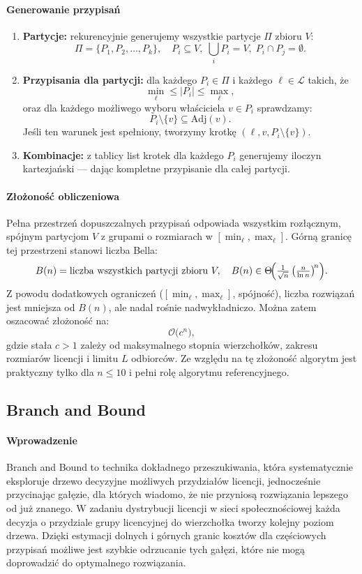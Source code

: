 \paragraph{Generowanie przypisań}
\begin{enumerate}
  \item \textbf{Partycje:} rekurencyjnie generujemy wszystkie partycje $\Pi$ zbioru $V$:
    \[
      \Pi = \{P_1,P_2,\dots,P_k\},\quad P_i\subseteq V,\;\bigcup_i P_i=V,\;P_i\cap P_j=\emptyset.
    \]
  \item \textbf{Przypisania dla partycji:} dla każdego $P_i\in\Pi$ i każdego $\ell\in\mathcal{L}$ takich, że 
    \[
      \min_\ell \le |P_i|\le \max_\ell,
    \]
    oraz dla każdego możliwego wyboru właściciela $v\in P_i$ sprawdzamy:
    \[
      P_i\setminus\{v\}\subseteq \mathrm{Adj}(v).
    \]
    Jeśli ten warunek jest spełniony, tworzymy krotkę $(\ell,v,P_i\setminus\{v\})$.
  \item \textbf{Kombinacje:} z tablicy list krotek dla każdego $P_i$ generujemy iloczyn kartezjański — dając kompletne przypisanie dla całej partycji.
\end{enumerate}

\paragraph{Złożoność obliczeniowa}
Pełna przestrzeń dopuszczalnych przypisań odpowiada wszystkim rozłącznym, spójnym partycjom $V$ z grupami o rozmiarach w $[\min_\ell,\max_\ell]$. Górną granicę tej przestrzeni stanowi liczba Bella:
\[
B(n)=\text{liczba wszystkich partycji zbioru }V,\quad
B(n)\in\Theta\!\Bigl(\tfrac{1}{\sqrt n}\,\bigl(\tfrac{n}{\ln n}\bigr)^{\!n}\Bigr).
\]
Z powodu dodatkowych ograniczeń ($[\min_\ell,\max_\ell]$, spójność), liczba rozwiązań jest mniejsza od $B(n)$, ale nadal rośnie nadwykładniczo. Można zatem oszacować złożoność na:
\[
\mathcal{O}\bigl(c^n\bigr),
\]
gdzie stała $c>1$ zależy od maksymalnego stopnia wierzchołków, zakresu rozmiarów licencji i limitu $L$ odbiorców. Ze względu na tę złożoność algorytm jest praktyczny tylko dla $n\le10$ i pełni rolę algorytmu referencyjnego.  

\subsection{Branch and Bound}

\paragraph{Wprowadzenie}  
Branch and Bound to technika dokładnego przeszukiwania, która systematycznie eksploruje drzewo decyzyjne możliwych przydziałów licencji, jednocześnie przycinając gałęzie, dla których wiadomo, że nie przyniosą rozwiązania lepszego od już znanego. W zadaniu dystrybucji licencji w sieci społecznościowej każda decyzja o przydziale grupy licencyjnej do wierzchołka tworzy kolejny poziom drzewa. Dzięki estymacji dolnych i górnych granic kosz­tów dla częściowych przypisań możliwe jest szybkie odrzucanie tych gałęzi, które nie mogą doprowadzić do optymalnego rozwiązania.

